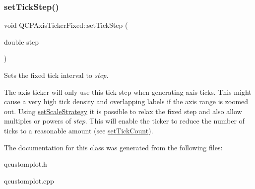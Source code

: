 \subsubsection{\texorpdfstring{set\+Tick\+Step()}{setTickStep()}}
{\footnotesize\ttfamily void Q\+C\+P\+Axis\+Ticker\+Fixed\+::set\+Tick\+Step (\begin{DoxyParamCaption}\item[{double}]{step }\end{DoxyParamCaption})}

Sets the fixed tick interval to {\itshape step}.

The axis ticker will only use this tick step when generating axis ticks. This might cause a very high tick density and overlapping labels if the axis range is zoomed out. Using \hyperlink{classQCPAxisTickerFixed_acbc7c9bcd80b3dc3edee5f0519d301f6}{set\+Scale\+Strategy} it is possible to relax the fixed step and also allow multiples or powers of {\itshape step}. This will enable the ticker to reduce the number of ticks to a reasonable amount (see \hyperlink{classQCPAxisTicker_a47752abba8293e6dc18491501ae34008}{set\+Tick\+Count}). 

The documentation for this class was generated from the following files\+:\begin{DoxyCompactItemize}
\item 
qcustomplot.\+h\item 
qcustomplot.\+cpp\end{DoxyCompactItemize}
